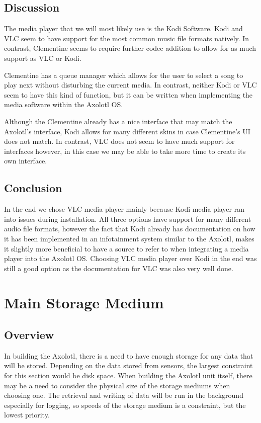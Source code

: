 \documentclass[onecolumn, draftclsnofoot,10pt, compsoc]{IEEEtran}
\begin{document}
\subsection{Discussion}
The media player that we will most likely use is the Kodi Software.
Kodi and VLC seem to have support for the most common music file formats natively.
In contrast, Clementine seems to require further codec addition to allow for as
much support as VLC or Kodi. 

Clementine has a queue manager which allows for the user to select a song to play
next without disturbing the current media. In contrast, neither Kodi or VLC seem to
have this kind of function, but it can be written when implementing the media
software within the Axolotl OS. 

Although the Clementine already has a nice interface that may match the Axolotl's
interface, Kodi allows for many different skins in case Clementine's UI does not
match. In contrast, VLC does not seem to have much support for interfaces however, 
in this case we may be able to take more time to create its own interface.

\subsection{Conclusion}
In the end we chose VLC media player mainly because Kodi media player ran into issues during installation. All three options have support for many different audio file formats, however the fact that Kodi already has documentation on how it has been implemented in an infotainment system similar to the Axolotl, makes it slightly more beneficial to have a source to refer to when integrating a media player into the Axolotl OS. Choosing VLC media player over Kodi in the end was still a good option as the documentation for VLC was also very well done.

\section{Main Storage Medium}
\subsection{Overview}
In building the Axolotl, there is a need to have enough storage for any data that will be stored. Depending on the data stored from sensors, the largest constraint for this section would be disk space. When building the Axolotl unit itself, there may be a need to consider the physical size of the storage mediums when choosing one. The retrieval and writing of data will be run in the background especially for logging, so speeds of the storage medium is a constraint, but the lowest priority.
\end{document}
